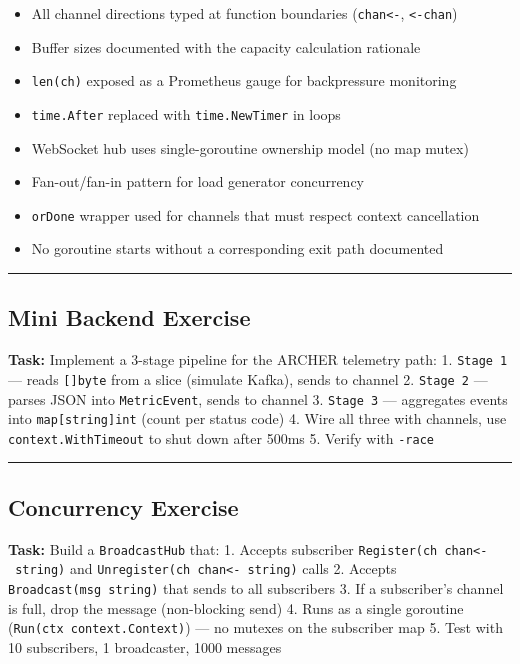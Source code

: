 \documentclass[11pt,a4paper,oneside]{book}
\providecommand{\tightlist}{\setlength{\itemsep}{0pt}\setlength{\parskip}{0pt}}
\begin{document}
\begin{itemize}
\tightlist
\item[$\square$]
  All channel directions typed at function boundaries
  (\texttt{chan\textless{}-}, \texttt{\textless{}-chan})
\item[$\square$]
  Buffer sizes documented with the capacity calculation rationale
\item[$\square$]
  \texttt{len(ch)} exposed as a Prometheus gauge for backpressure
  monitoring
\item[$\square$]
  \texttt{time.After} replaced with \texttt{time.NewTimer} in loops
\item[$\square$]
  WebSocket hub uses single-goroutine ownership model (no map mutex)
\item[$\square$]
  Fan-out/fan-in pattern for load generator concurrency
\item[$\square$]
  \texttt{orDone} wrapper used for channels that must respect context
  cancellation
\item[$\square$]
  No goroutine starts without a corresponding exit path documented
\end{itemize}

\begin{center}\rule{0.5\linewidth}{0.5pt}\end{center}

\subsection{Mini Backend Exercise}

\textbf{Task:} Implement a 3-stage pipeline for the ARCHER telemetry
path: 1. \texttt{Stage\ 1} --- reads \texttt{{[}{]}byte} from a slice
(simulate Kafka), sends to channel 2. \texttt{Stage\ 2} --- parses JSON
into \texttt{MetricEvent}, sends to channel 3. \texttt{Stage\ 3} ---
aggregates events into \texttt{map{[}string{]}int} (count per status
code) 4. Wire all three with channels, use \texttt{context.WithTimeout}
to shut down after 500ms 5. Verify with \texttt{-race}

\begin{center}\rule{0.5\linewidth}{0.5pt}\end{center}

\subsection{Concurrency Exercise}

\textbf{Task:} Build a \texttt{BroadcastHub} that: 1. Accepts subscriber
\texttt{Register(ch\ chan\textless{}-\ string)} and
\texttt{Unregister(ch\ chan\textless{}-\ string)} calls 2. Accepts
\texttt{Broadcast(msg\ string)} that sends to all subscribers 3. If a
subscriber's channel is full, drop the message (non-blocking send) 4.
Runs as a single goroutine (\texttt{Run(ctx\ context.Context)}) --- no
mutexes on the subscriber map 5. Test with 10 subscribers, 1
broadcaster, 1000 messages
\end{document}
